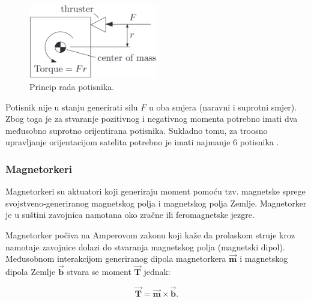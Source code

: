 \documentclass[times, utf8, diplomski, numeric]{templates/template}
\begin{document}
{{{{                \begin{figure}[htb]
                \centering
                \includegraphics[width=0.5\textwidth]{images/thruster_img.png}
                \caption{Princip rada potisnika.}
                \label{fig:thruster_img}
                \end{figure}

                Potisnik nije u stanju generirati silu $F$ u oba smjera (naravni i suprotni smjer). Zbog toga je za stvaranje pozitivnog i negativnog momenta potrebno imati dva međusobno suprotno orijentirana potisnika. Sukladno tomu, za troosno upravljanje orijentacijom satelita potrebno je imati najmanje 6 potisnika \cite{adcsKnjiga}.
            }


            \subsubsection{Magnetorkeri }{
                Magnetorkeri su aktuatori koji generiraju moment pomoću tzv. magnetske sprege svojstveno-generiranog magnetskog polja i magnetskog polja Zemlje. Magnetorker je u suštini zavojnica namotana oko zračne ili feromagnetske jezgre. 

                Magnetorker počiva na Amperovom zakonu koji kaže da prolaskom struje kroz namotaje zavojnice dolazi do stvaranja magnetskog polja (magnetski dipol). Međusobnom interakcijom generiranog dipola magnetorkera $\overrightarrow{\boldsymbol{m}}$ i magnetskog dipola Zemlje $\overrightarrow{\boldsymbol{b}}$ stvara se moment $\overrightarrow{\boldsymbol{T}}$ jednak:

                \begin{equation}
                    \label{eq:magnetorker_eq}
                    \overrightarrow{\boldsymbol{T}} = \overrightarrow{\boldsymbol{m}} \times \overrightarrow{\boldsymbol{b}}.
                \end{equation}

}}}}
\end{document}
